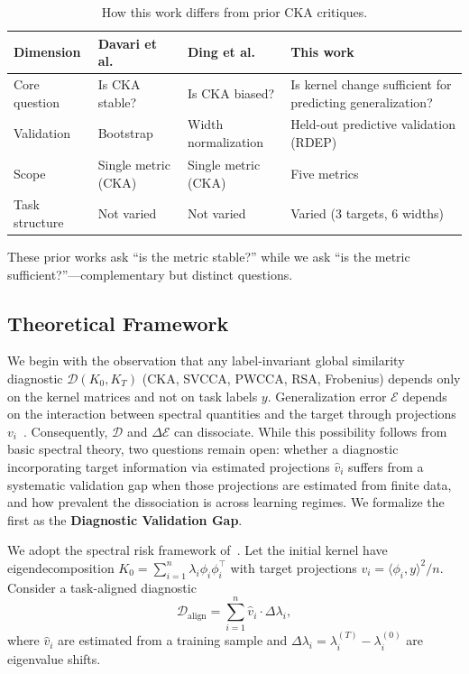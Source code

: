 \documentclass[twoside,11pt]{article}
\begin{document}
\begin{table}[h]
\centering\small
\caption{How this work differs from prior CKA critiques.}
\label{tab:related_diff}
\begin{tabular}{p{3cm}p{3.2cm}p{3.2cm}p{3.2cm}}
\toprule
Dimension & Davari et al.~\cite{davari2022reliability} & Ding et al.~\cite{ding2021grounding} & This work \\
\midrule
Core question & Is CKA stable? & Is CKA biased? & Is kernel change sufficient for predicting generalization? \\
Validation & Bootstrap & Width normalization & Held-out predictive validation (RDEP) \\
Scope & Single metric (CKA) & Single metric (CKA) & Five metrics \\
Task structure & Not varied & Not varied & Varied (3 targets, 6 widths) \\
\bottomrule
\end{tabular}
\end{table}

These prior works ask ``is the metric stable?'' while we ask ``is the metric sufficient?''---complementary but distinct questions.

\subsection{Theoretical Framework}
\label{sec:proposition}

We begin with the observation that any label-invariant global similarity diagnostic $\mathcal{D}(K_0, K_T)$ (CKA, SVCCA, PWCCA, RSA, Frobenius) depends only on the kernel matrices and not on task labels $y$. Generalization error $\mathcal{E}$ depends on the interaction between spectral quantities and the target through projections $v_i$~\citep{canatar2021spectral}. Consequently, $\mathcal{D}$ and $\Delta\mathcal{E}$ can dissociate. While this possibility follows from basic spectral theory, two questions remain open: whether a diagnostic incorporating target information via estimated projections $\hat{v}_i$ suffers from a systematic validation gap when those projections are estimated from finite data, and how prevalent the dissociation is across learning regimes. We formalize the first as the \textbf{Diagnostic Validation Gap}.

We adopt the spectral risk framework of~\citet{canatar2021spectral}. Let the initial kernel have eigendecomposition $K_0 = \sum_{i=1}^n \lambda_i \phi_i \phi_i^\top$ with target projections $v_i = \langle \phi_i, y \rangle^2 / n$. Consider a task-aligned diagnostic
\[
\mathcal{D}_{\text{align}} = \sum_{i=1}^n \hat{v}_i \cdot \Delta\lambda_i,
\]
where $\hat{v}_i$ are estimated from a training sample and $\Delta\lambda_i = \lambda_i^{(T)} - \lambda_i^{(0)}$ are eigenvalue shifts.
\end{document}
